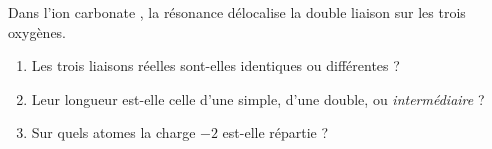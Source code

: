 \documentclass[11pt,a4paper]{article}
\begin{document}
\begin{exo}
Dans l'ion carbonate , la résonance délocalise la double liaison sur les trois oxygènes.
\begin{enumerate}[label=\alph*)]
  \item Les trois liaisons  réelles sont-elles identiques ou différentes ?
  \item Leur longueur est-elle celle d'une simple, d'une double, ou \emph{intermédiaire} ?
  \item Sur quels atomes la charge $-2$ est-elle répartie ?
\end{enumerate}
\end{exo}
\end{document}
